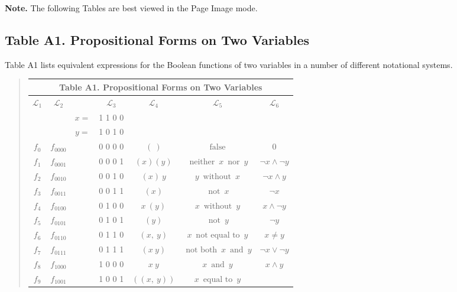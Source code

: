 \documentclass[12pt]{article}
\begin{document}
\textbf{Note.}  The following Tables are best viewed in the Page Image mode.

\tableofcontents

\subsection{Table A1.  Propositional Forms on Two Variables}

Table A1 lists equivalent expressions for the Boolean functions of two variables in a number of different notational systems.

\begin{quote}\begin{tabular}{|c|c|c|c|c|c|c|}
\multicolumn{7}{c}{\textbf{Table A1.  Propositional Forms on Two Variables}} \\
\hline
$\mathcal{L}_1$ &
$\mathcal{L}_2$ &&
$\mathcal{L}_3$ &
$\mathcal{L}_4$ &
$\mathcal{L}_5$ &
$\mathcal{L}_6$ \\
\hline
& & $x =$ & 1 1 0 0 & & & \\
& & $y =$ & 1 0 1 0 & & & \\
\hline
$f_{0}$     &
$f_{0000}$  &&
0 0 0 0     &
$(~)$       &
$\operatorname{false}$ &
$0$         \\
$f_{1}$     &
$f_{0001}$  &&
0 0 0 1     &
$(x)(y)$    &
$\operatorname{neither}\ x\ \operatorname{nor}\ y$ &
$\lnot x \land \lnot y$ \\
$f_{2}$     &
$f_{0010}$  &&
0 0 1 0     &
$(x)\ y$    &
$y\ \operatorname{without}\ x$ &
$\lnot x \land y$ \\
$f_{3}$     &
$f_{0011}$  &&
0 0 1 1     &
$(x)$       &
$\operatorname{not}\ x$ &
$\lnot x$   \\
$f_{4}$     &
$f_{0100}$  &&
0 1 0 0     &
$x\ (y)$    &
$x\ \operatorname{without}\ y$ &
$x \land \lnot y$ \\
$f_{5}$     &
$f_{0101}$  &&
0 1 0 1     &
$(y)$       &
$\operatorname{not}\ y$ &
$\lnot y$   \\
$f_{6}$     &
$f_{0110}$  &&
0 1 1 0     &
$(x,\ y)$   &
$x\ \operatorname{not~equal~to}\ y$ &
$x \ne y$   \\
$f_{7}$     &
$f_{0111}$  &&
0 1 1 1     &
$(x\ y)$    &
$\operatorname{not~both}\ x\ \operatorname{and}\ y$ &
$\lnot x \lor \lnot y$ \\
\hline
$f_{8}$     &
$f_{1000}$  &&
1 0 0 0     &
$x\ y$      &
$x\ \operatorname{and}\ y$ &
$x \land y$ \\
$f_{9}$     &
$f_{1001}$  &&
1 0 0 1     &
$((x,\ y))$ &
$x\ \operatorname{equal~to}\ y$ &

\end{tabular}
\end{quote}
\end{document}
